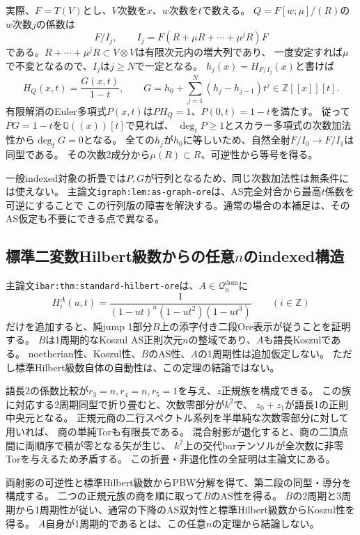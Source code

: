 \documentclass[11pt,a4paper]{ltjsarticle}
\begin{document}
実際、$F=T(V)$とし、$V$次数を$x$、$w$次数を$t$で数える。
$Q=F[w;\mu]/(R)$の$w$次数$j$の係数は
\[
F/I_j,\qquad I_j=F(R+\mu R+\cdots+\mu^jR)F
\]
である。$R+\cdots+\mu^jR\subset V\otimes V$は有限次元内の増大列であり、
一度安定すれば$\mu$で不変となるので、$I_j$は$j\ge N$で一定となる。
$h_j(x)=H_{F/I_j}(x)$と書けば
\[
H_Q(x,t)=\frac{G(x,t)}{1-t},\qquad
G=h_0+\sum_{j=1}^N(h_j-h_{j-1})t^j\in\mathbb Z[[x]][t].
\]
有限解消のEuler多項式$P(x,t)$は$P H_Q=1$、$P(0,t)=1-t$を満たす。
従って$PG=1-t$を$\mathbb Q((x))[t]$で見れば、
$\deg_tP\ge1$とスカラー多項式の次数加法性から$\deg_tG=0$となる。
全ての$h_j$が$h_0$に等しいため、自然全射$F/I_0\to F/I_1$は同型である。
その次数2成分から$\mu(R)\subset R$、可逆性から等号を得る。

一般indexed対象の折畳では$P,G$が行列となるため、同じ次数加法性は無条件には使えない。
主論文\texttt{igraph:lem:as-graph-ore}は、AS完全対合から最高$t$係数を可逆にすることで
この行列版の障害を解決する。通常の場合の本補足は、そのAS仮定も不要にできる点で異なる。

\subsection{標準二変数Hilbert級数からの任意\texorpdfstring{$n$}{n}のindexed構造}
\label{note:indexed-standard-hilbert-ore}
主論文\texttt{ibar:thm:standard-hilbert-ore}は、$A\in\mathcal Q_n^{\mathrm{dom}}$に
\[
H_i^A(u,t)=\frac1{(1-ut)^n(1-ut^2)(1-ut^3)}
\qquad(i\in\mathbb Z)
\]
だけを追加すると、純jump 1部分$B$上の添字付き二段Ore表示が従うことを証明する。
$B$は1周期的なKoszul AS正則次元$n$の整域であり、$A$も語長Koszulである。
noetherian性、Koszul性、$B$のAS性、$A$の1周期性は追加仮定しない。
ただし標準Hilbert級数自体の自動性は、この定理の結論ではない。

語長2の係数比較が$r_3=n,r_4=n,r_5=1$を与え、$z$正規族を構成できる。
この族に対応する2周期同型で折り畳むと、次数零部分が$k^2$で、
$z_0+z_1$が語長1の正則中央元となる。
正規元商の二行スペクトル系列を半単純な次数零部分に対して用いれば、
商の単純Torも有限長である。
混合射影が退化すると、商の二頂点間に両順序で積が零となる矢が生じ、
$k^2$上の交代barテンソルが全次数に非零Torを与えるため矛盾する。
この折畳・非退化性の全証明は主論文にある。

両射影の可逆性と標準Hilbert級数からPBW分解を得て、第二段の同型・導分を構成する。
二つの正規元族の商を順に取って$B$のAS性を得る。
$B$の2周期と3周期から1周期性が従い、通常の下降のAS双対性と標準Hilbert級数からKoszul性を得る。
$A$自身が1周期的であるとは、この任意$n$の定理から結論しない。
\end{document}
